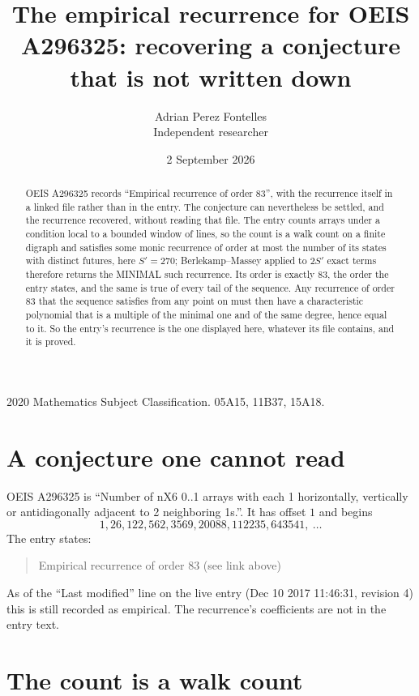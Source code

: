 \documentclass[11pt,a4paper]{article}
\title{The empirical recurrence for OEIS A296325: recovering a conjecture that is not written down}
\author{Adrian Perez Fontelles\\ \small Independent researcher}
\date{2 September 2026}
\theoremstyle{plain}
\theoremstyle{definition}
\begin{document}
\maketitle

\begin{abstract}
OEIS A296325 records ``Empirical recurrence of order $83$'', with the recurrence itself in a
linked file rather than in the entry. The conjecture can nevertheless be settled, and the
recurrence recovered, without reading that file. The entry counts arrays under a condition
local to a bounded window of lines, so the count is a walk count on a finite digraph and
satisfies some monic recurrence of order at most the number of its states with distinct
futures, here $S'=270$; Berlekamp--Massey applied to $2S'$ exact
terms therefore returns the MINIMAL such recurrence. Its order is exactly $83$, the order
the entry states, and the same is true of every tail of the sequence. Any recurrence of order
$83$ that the sequence satisfies from any point on must then have a characteristic
polynomial that is a multiple of the minimal one and of the same degree, hence equal to it. So
the entry's recurrence is the one displayed here, whatever its file contains, and it is
proved.
\end{abstract}

\noindent\small 2020 Mathematics Subject Classification. 05A15, 11B37, 15A18.\normalsize

\section{A conjecture one cannot read}

OEIS A296325 is ``Number of nX6 0..1 arrays with each 1 horizontally, vertically or antidiagonally adjacent to 2 neighboring 1s.''. It has offset $1$ and begins
\[
1, 26, 122, 562, 3569, 20088, 112235, 643541,\ \dots
\]
The entry states:
\begin{quote}
Empirical recurrence of order 83 (see link above)
\end{quote}
As of the ``Last modified'' line on the live entry (Dec 10 2017 11:46:31, revision 4) this is still
recorded as empirical. The recurrence's coefficients are not in the entry text.

\section{The count is a walk count}
\end{document}
